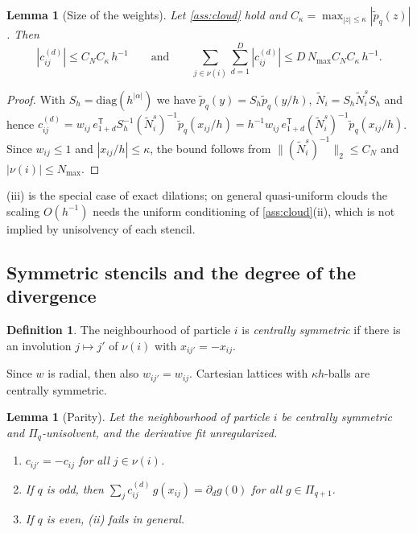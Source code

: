 \documentclass[11pt,a4paper]{article}
\theoremstyle{plain}
\newtheorem{lemma}[theorem]{Lemma}
\theoremstyle{definition}
\newtheorem{definition}[theorem]{Definition}
\theoremstyle{remark}
\numberwithin{equation}{section}
\newcommand{\nb}{\nu}
\newcommand{\ptil}{\tilde p}
\newcommand{\Ntil}{\tilde N}
\begin{document}
\begin{lemma}[Size of the weights]\label{lem:weightbound}
Let \cref{ass:cloud} hold and $C_\kappa=\max_{|z|\le\kappa}|\ptil_q(z)|$. Then
\[
|c^{(d)}_{ij}|\le C_N C_\kappa\,h^{-1}\qquad\text{and}\qquad\sum_{j\in\nb(i)}\sum_{d=1}^D|c^{(d)}_{ij}|\le D\,N_{\max}C_NC_\kappa\,h^{-1}.
\]
\end{lemma}

\begin{proof}
With $S_h=\mathrm{diag}(h^{|\alpha|})$ we have $\ptil_q(y)=S_h\ptil_q(y/h)$, $\Ntil_i=S_h\Ntil^s_iS_h$ and hence $c^{(d)}_{ij}=w_{ij}\,e_{1+d}^{\mathsf T}S_h^{-1}(\Ntil^s_i)^{-1}\ptil_q(x_{ij}/h)=h^{-1}w_{ij}\,e_{1+d}^{\mathsf T}(\Ntil^s_i)^{-1}\ptil_q(x_{ij}/h)$. Since $w_{ij}\le1$ and $|x_{ij}/h|\le\kappa$, the bound follows from $\|(\Ntil^s_i)^{-1}\|_2\le C_N$ and $|\nb(i)|\le N_{\max}$.
\end{proof}

(iii) is the special case of exact dilations; on general quasi-uniform clouds the scaling $O(h^{-1})$ needs the uniform conditioning of \cref{ass:cloud}(ii), which is not implied by unisolvency of each stencil.

\subsection{Symmetric stencils and the degree of the divergence}\label{sec:parity}

\begin{definition}
The neighbourhood of particle $i$ is \emph{centrally symmetric} if there is an involution $j\mapsto j'$ of $\nb(i)$ with $x_{ij'}=-x_{ij}$.
\end{definition}

Since $w$ is radial, then also $w_{ij'}=w_{ij}$. Cartesian lattices with $\kappa h$-balls are centrally symmetric.

\begin{lemma}[Parity]\label{lem:parity}
Let the neighbourhood of particle $i$ be centrally symmetric and $\Pi_q$-unisolvent, and the derivative fit unregularized.
\begin{enumerate}[label=(\roman*)]
\item $c_{ij'}=-c_{ij}$ for all $j\in\nb(i)$.
\item If $q$ is odd, then $\sum_{j} c^{(d)}_{ij}\,g(x_{ij}) = \partial_d g(0)$ for all $g\in\Pi_{q+1}$.
\item If $q$ is even, (ii) fails in general.
\end{enumerate}
\end{lemma}
\end{document}
